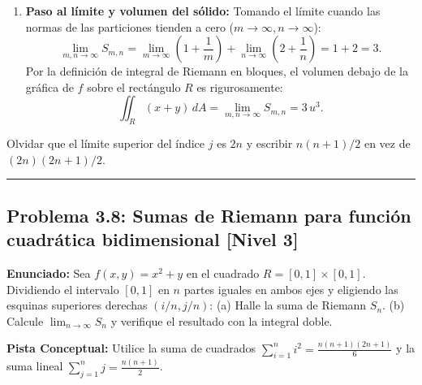 \documentclass[11pt,a4paper]{article}
\begin{document}
\begin{enumerate}[label=\textbf{\arabic*.}]
\item \textbf{Paso al límite y volumen del sólido:}
Tomando el límite cuando las normas de las particiones tienden a cero ($m \to \infty, n \to \infty$):
\begin{equation*}
\lim_{m,n \to \infty} S_{m,n} = \lim_{m \to \infty} \left(1 + \frac{1}{m}\right) + \lim_{n \to \infty} \left(2 + \frac{1}{n}\right) = 1 + 2 = 3.
\end{equation*}
Por la definición de integral de Riemann en bloques, el volumen debajo de la gráfica de $f$ sobre el rectángulo $R$ es rigurosamente:
\begin{equation*}
\iint_R (x + y) \, dA = \lim_{m,n \to \infty} S_{m,n} = 3 \, u^3.
\end{equation*}
\end{enumerate}

\begin{trapbox}
Olvidar que el límite superior del índice $j$ es $2n$ y escribir $n(n+1)/2$ en vez de $(2n)(2n+1)/2$.
\end{trapbox}

\vspace{0.5cm}
\hrule
\vspace{0.5cm}

\subsection*{Problema 3.8: Sumas de Riemann para función cuadrática bidimensional \hfill \color{primaryblue}\small[Nivel 3]}

\begin{tcolorbox}[colback=white,colframe=gray!40,arc=1mm,boxrule=0.5pt,left=3mm,right=3mm,top=2mm,bottom=2mm]
\textbf{Enunciado:} Sea $f(x,y) = x^2 + y$ en el cuadrado $R = [0, 1] \times [0, 1]$. Dividiendo el intervalo $[0,1]$ en $n$ partes iguales en ambos ejes y eligiendo las esquinas superiores derechas $(i/n, j/n)$: (a) Halle la suma de Riemann $S_n$. (b) Calcule $\lim_{n\to\infty} S_n$ y verifique el resultado con la integral doble.
\end{tcolorbox}

\begin{tcolorbox}[colback=yellow!4,colframe=accentamber!70,arc=1mm,boxrule=0.5pt,left=3mm,right=3mm,top=1.5mm,bottom=1.5mm]
\textbf{Pista Conceptual:} Utilice la suma de cuadrados $\sum_{i=1}^n i^2 = \frac{n(n+1)(2n+1)}{6}$ y la suma lineal $\sum_{j=1}^n j = \frac{n(n+1)}{2}$.
\end{tcolorbox}
\end{document}
